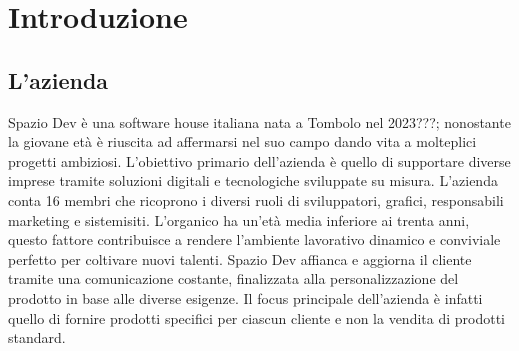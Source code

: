 \chapter{Introduzione}
\label{cap:introduzione}

%
%
%
%

\section{L'azienda}
Spazio Dev è una software house italiana nata a Tombolo nel 2023???; nonostante la giovane età è riuscita ad affermarsi nel suo campo dando vita a molteplici progetti ambiziosi. L'obiettivo primario dell'azienda è quello di supportare diverse imprese tramite soluzioni digitali e tecnologiche sviluppate su misura.
L'azienda conta 16 membri che ricoprono i diversi ruoli di sviluppatori, grafici, responsabili marketing e sistemisiti. L'organico ha un'età media inferiore ai trenta anni, questo fattore contribuisce a rendere l'ambiente lavorativo dinamico e conviviale perfetto per coltivare nuovi talenti.
Spazio Dev affianca e aggiorna il cliente tramite una comunicazione costante, finalizzata alla personalizzazione del prodotto in base alle diverse esigenze. Il focus principale dell'azienda è infatti quello di fornire prodotti specifici per ciascun cliente e non la vendita di prodotti standard.

